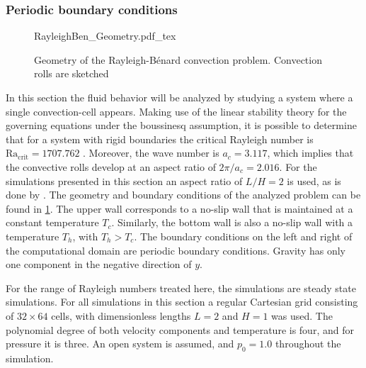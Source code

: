 \subsubsection{Periodic boundary conditions}\label{ssec:SingleCellConv}
\begin{figure}[bt]
	\begin{center}
		\def\svgwidth{0.83\textwidth}
		{RayleighBen_Geometry.pdf_tex}
		\caption{Geometry of the Rayleigh-Bénard convection problem. Convection rolls are sketched}
		\label{fig:RayBenGeometryPeriodic}
	\end{center}
\end{figure}
In this section the fluid behavior will be analyzed by studying a system where a single convection-cell appears. Making use of the linear stability theory for the governing equations under the boussinesq assumption, it is possible to determine that for a system with rigid boundaries the critical Rayleigh number is $\text{Ra}_{\text{crit}} = 1707.762$ \parencite{chandrasekharHydrodynamicHydromagneticStability1961}.  Moreover, the wave number is $a_c =3.117$, which implies that the convective rolls develop at an aspect ratio of $2 \pi/a_c = 2.016$. For the simulations presented in this section an aspect ratio of $L/H = 2$ is used, as is done by \textcite{kaoSimulatingOscillatoryFlows2007}. The geometry and boundary conditions of the analyzed problem can be found in \cref{fig:RayBenGeometryPeriodic}. The upper wall corresponds to a no-slip wall that is maintained at a constant temperature $T_c$. Similarly, the bottom wall is also a no-slip wall with a temperature $T_h$, with $T_h > T_c$. The boundary conditions on the left and right of the computational domain are periodic boundary conditions. Gravity has only one component in the negative direction of $y$. %

For the range of Rayleigh numbers treated here, the simulations are steady state simulations. For all simulations in this section a regular Cartesian grid consisting of $32\times64$ cells, with dimensionless lengths $L = 2$ and $H = 1$ was used. The polynomial degree of both velocity components and temperature is four, and for pressure it is three. An open system is assumed, and $p_0 = 1.0$ throughout the simulation.


